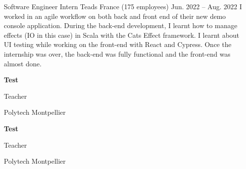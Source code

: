 \documentclass[11pt]{spidercv}
\newcommand{\ul}[1]{%
  \uline{\phantom{#1}}%
  \llap{\contour{white}{#1}}%
}
\begin{document}
\begin{MainPart}
  \Experience
  {\ColorHighlight}
  {Software Engineer Intern}
  {Teads France (175 employees)}
  {Jun. 2022 -- Aug. 2022}{
    I worked in an agile workflow on both back and front end of their new demo console application. During the back-end development, I learnt how to manage effects (IO in this case) in Scala with the Cats Effect framework. I learnt about UI testing while working on the front-end with React and Cypress. Once the internship was over, the back-end was fully functional and the front-end was almost done.
  }

  \vspace{0.4cm}
  \begin{minipage}{0.45\linewidth}
    \begin{framed}
      \textbf{Test}

      Teacher

      Polytech Montpellier
    \end{framed}
  \end{minipage}
  \hfill
  \begin{minipage}{0.45\linewidth}
    \begin{framed}
      \textbf{Test}

      Teacher

      Polytech Montpellier
    \end{framed}
  \end{minipage}
  \hfill

\end{MainPart}
\end{document}
